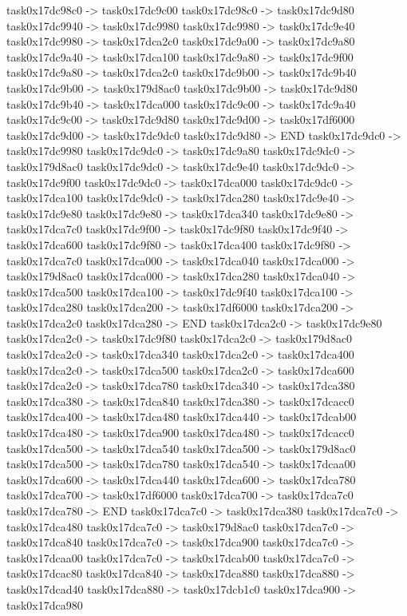 {	task0x17dc98c0 -> task0x17dc9c00
	task0x17dc98c0 -> task0x17dc9d80
	task0x17dc9940 -> task0x17dc9980
	task0x17dc9980 -> task0x17dc9e40
	task0x17dc9980 -> task0x17dca2c0
	task0x17dc9a00 -> task0x17dc9a80
	task0x17dc9a40 -> task0x17dca100
	task0x17dc9a80 -> task0x17dc9f00
	task0x17dc9a80 -> task0x17dca2c0
	task0x17dc9b00 -> task0x17dc9b40
	task0x17dc9b00 -> task0x179d8ac0
	task0x17dc9b00 -> task0x17dc9d80
	task0x17dc9b40 -> task0x17dca000
	task0x17dc9c00 -> task0x17dc9a40
	task0x17dc9c00 -> task0x17dc9d80
	task0x17dc9d00 -> task0x17df6000
	task0x17dc9d00 -> task0x17dc9dc0
	task0x17dc9d80 -> END
	task0x17dc9dc0 -> task0x17dc9980
	task0x17dc9dc0 -> task0x17dc9a80
	task0x17dc9dc0 -> task0x179d8ac0
	task0x17dc9dc0 -> task0x17dc9e40
	task0x17dc9dc0 -> task0x17dc9f00
	task0x17dc9dc0 -> task0x17dca000
	task0x17dc9dc0 -> task0x17dca100
	task0x17dc9dc0 -> task0x17dca280
	task0x17dc9e40 -> task0x17dc9e80
	task0x17dc9e80 -> task0x17dca340
	task0x17dc9e80 -> task0x17dca7c0
	task0x17dc9f00 -> task0x17dc9f80
	task0x17dc9f40 -> task0x17dca600
	task0x17dc9f80 -> task0x17dca400
	task0x17dc9f80 -> task0x17dca7c0
	task0x17dca000 -> task0x17dca040
	task0x17dca000 -> task0x179d8ac0
	task0x17dca000 -> task0x17dca280
	task0x17dca040 -> task0x17dca500
	task0x17dca100 -> task0x17dc9f40
	task0x17dca100 -> task0x17dca280
	task0x17dca200 -> task0x17df6000
	task0x17dca200 -> task0x17dca2c0
	task0x17dca280 -> END
	task0x17dca2c0 -> task0x17dc9e80
	task0x17dca2c0 -> task0x17dc9f80
	task0x17dca2c0 -> task0x179d8ac0
	task0x17dca2c0 -> task0x17dca340
	task0x17dca2c0 -> task0x17dca400
	task0x17dca2c0 -> task0x17dca500
	task0x17dca2c0 -> task0x17dca600
	task0x17dca2c0 -> task0x17dca780
	task0x17dca340 -> task0x17dca380
	task0x17dca380 -> task0x17dca840
	task0x17dca380 -> task0x17dcacc0
	task0x17dca400 -> task0x17dca480
	task0x17dca440 -> task0x17dcab00
	task0x17dca480 -> task0x17dca900
	task0x17dca480 -> task0x17dcacc0
	task0x17dca500 -> task0x17dca540
	task0x17dca500 -> task0x179d8ac0
	task0x17dca500 -> task0x17dca780
	task0x17dca540 -> task0x17dcaa00
	task0x17dca600 -> task0x17dca440
	task0x17dca600 -> task0x17dca780
	task0x17dca700 -> task0x17df6000
	task0x17dca700 -> task0x17dca7c0
	task0x17dca780 -> END
	task0x17dca7c0 -> task0x17dca380
	task0x17dca7c0 -> task0x17dca480
	task0x17dca7c0 -> task0x179d8ac0
	task0x17dca7c0 -> task0x17dca840
	task0x17dca7c0 -> task0x17dca900
	task0x17dca7c0 -> task0x17dcaa00
	task0x17dca7c0 -> task0x17dcab00
	task0x17dca7c0 -> task0x17dcac80
	task0x17dca840 -> task0x17dca880
	task0x17dca880 -> task0x17dcad40
	task0x17dca880 -> task0x17dcb1c0
	task0x17dca900 -> task0x17dca980
}
